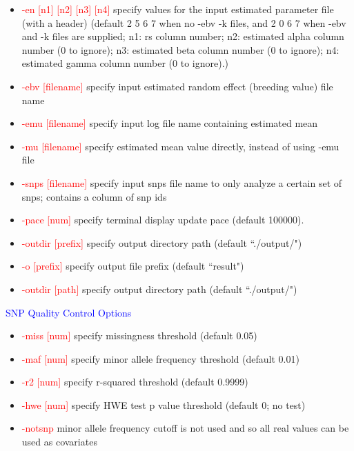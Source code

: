 \documentclass[11pt]{article}
\begin{document}
\begin{itemize}
\item  \textcolor{red}{ -en [n1]  [n2]  [n3]  [n4]}     \quad    specify values for the input estimated parameter file (with a header) (default 2 5 6 7 when no -ebv -k files, and 2 0 6 7 when -ebv and -k files are supplied; n1: rs column number; n2: estimated alpha column number (0 to ignore); n3: estimated beta column number (0 to ignore); n4: estimated gamma column number (0 to ignore).)
\item  \textcolor{red}{ -ebv        [filename] }     \quad    specify input estimated random effect (breeding value) file name
\item  \textcolor{red}{ -emu        [filename] }     \quad    specify input log file name containing estimated mean
\item  \textcolor{red}{ -mu        [filename] }     \quad    specify estimated mean value directly, instead of using -emu file
\item  \textcolor{red}{ -snps        [filename] }     \quad    specify input snps file name to only analyze a certain set of snps; contains a column of snp ids
\item  \textcolor{red}{ -pace     [num]}     \quad           specify terminal display update pace (default 100000).
\item  \textcolor{red}{ -outdir        [prefix]}     \quad        specify output directory path (default ``./output/")
\item  \textcolor{red}{ -o        [prefix]}     \quad        specify output file prefix (default ``result")
\item  \textcolor{red}{ -outdir        [path]}     \quad        specify output directory path (default ``./output/")
\end{itemize}
%
\textcolor{blue}{SNP Quality Control Options}
%
\begin{itemize}
\item  \textcolor{red}{-miss     [num] }     \quad          specify missingness threshold (default 0.05)
\item  \textcolor{red}{-maf      [num] }     \quad          specify minor allele frequency threshold (default 0.01)
\item  \textcolor{red}{-r2      [num] }     \quad           specify r-squared threshold (default 0.9999)
\item  \textcolor{red}{-hwe      [num] }     \quad           specify HWE test p value threshold (default 0; no test)
\item  \textcolor{red}{-notsnp  }     \quad          minor allele frequency cutoff is not used and so all real values can be used as covariates
\end{itemize}
\end{document}
